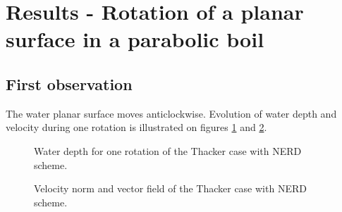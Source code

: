 \section{Results - Rotation of a planar surface in a parabolic boil}

\subsection{First observation}

The water planar surface moves anticlockwise. Evolution of water depth and velocity during one rotation
is illustrated on figures \ref{fig:thacker:WDTime} and \ref{fig:thacker:VelocityTime}.


\begin{figure}[h!]
\begin{minipage}[t]{0.5\textwidth}
 \centering
\end{minipage}%
\begin{minipage}[t]{0.5\textwidth}
 \centering
\end{minipage}
\begin{minipage}[t]{0.5\textwidth}
 \centering
\end{minipage}%
\begin{minipage}[t]{0.5\textwidth}
 \centering
\end{minipage}
  \caption{Water depth for one rotation of the Thacker case with NERD scheme.}
  \label{fig:thacker:WDTime}
\end{figure}

\begin{figure}[H]
\begin{minipage}[t]{0.5\textwidth}
 \centering
\end{minipage}%
\begin{minipage}[t]{0.5\textwidth}
 \centering
\end{minipage}
\begin{minipage}[t]{0.5\textwidth}
 \centering
\end{minipage}%
\begin{minipage}[t]{0.5\textwidth}
 \centering
\end{minipage}
  \caption{Velocity norm and vector field of the Thacker case with NERD scheme.}
  \label{fig:thacker:VelocityTime}
\end{figure}

